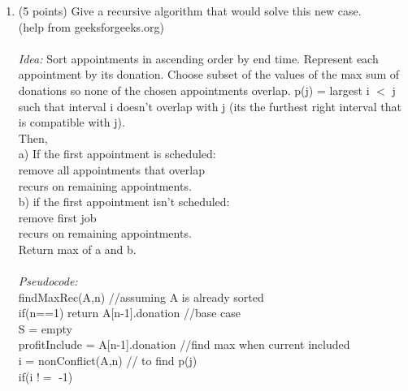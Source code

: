 \documentclass[12pt]{article}
\begin{document}
\begin{enumerate}
\begin{enumerate}
\pagebreak
    \item \label{2b} (5 points) Give a recursive algorithm that would solve this new case.\\ (help from geeksforgeeks.org)\\
\\
\textit{Idea:} Sort appointments in ascending order by end time. Represent each appointment by its donation. Choose subset of the values of the max sum of donations so none of the chosen appointments overlap. p(j) = largest i $<$ j such that interval i doesn't overlap with j (its the furthest right interval that is compatible with j).\\ Then, \\
\hspace*{10mm} a) If the first appointment is scheduled: \\
\hspace*{20mm}  remove all appointments that overlap \\
\hspace*{20mm} recurs on remaining appointments.\\
\hspace*{10mm} b) if the first appointment isn't scheduled: \\
\hspace*{20mm}  remove first job \\
\hspace*{20mm}  recurs on remaining appointments. \\
 Return max of a and b. \\
 \\
 \textit{Pseudocode:} \\
 findMaxRec(A,n) \hspace*{50mm} //assuming A is already sorted \\
 \hspace*{10mm} if(n==1) return A[n-1].donation \hspace*{10mm} //base case \\
 \hspace*{10mm} S = empty \\
 \hspace*{10mm} profitInclude = A[n-1].donation  \hspace*{10mm} //find max when current included\\
 \hspace*{10mm} i = nonConflict(A,n) \hspace*{30mm}// to find p(j)\\
 \hspace*{10mm} if(i $!=$ -1) \\

\end{enumerate}
\end{enumerate}
\end{document}
